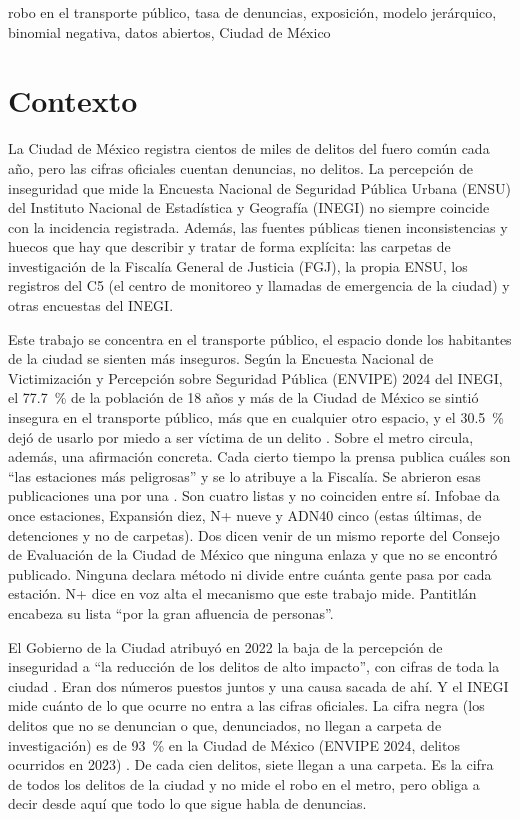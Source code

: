 \documentclass[conference]{IEEEtran}
\begin{document}
\begin{IEEEkeywords}
robo en el transporte público, tasa de denuncias, exposición, modelo jerárquico, binomial negativa, datos abiertos, Ciudad de México
\end{IEEEkeywords}

\section{Contexto}

La Ciudad de México registra cientos de miles de delitos del fuero común cada año, pero las cifras oficiales cuentan denuncias, no delitos. La percepción de inseguridad que mide la Encuesta Nacional de Seguridad Pública Urbana (ENSU) del Instituto Nacional de Estadística y Geografía (INEGI) no siempre coincide con la incidencia registrada. Además, las fuentes públicas tienen inconsistencias y huecos que hay que describir y tratar de forma explícita: las carpetas de investigación de la Fiscalía General de Justicia (FGJ), la propia ENSU, los registros del C5 (el centro de monitoreo y llamadas de emergencia de la ciudad) y otras encuestas del INEGI.

Este trabajo se concentra en el transporte público, el espacio donde los habitantes de la ciudad se sienten más inseguros. Según la Encuesta Nacional de Victimización y Percepción sobre Seguridad Pública (ENVIPE) 2024 del INEGI, el 77.7~\% de la población de 18 años y más de la Ciudad de México se sintió insegura en el transporte público, más que en cualquier otro espacio, y el 30.5~\% dejó de usarlo por miedo a ser víctima de un delito \cite{envipe2024cdmx}. Sobre el metro circula, además, una afirmación concreta. Cada cierto tiempo la prensa publica cuáles son ``las estaciones más peligrosas'' y se lo atribuye a la Fiscalía. Se abrieron esas publicaciones una por una \cite{infobae2024,expansion2024,nmas2023,adn40_2026}. Son cuatro listas y no coinciden entre sí. Infobae da once estaciones, Expansión diez, N+ nueve y ADN40 cinco (estas últimas, de detenciones y no de carpetas). Dos dicen venir de un mismo reporte del Consejo de Evaluación de la Ciudad de México que ninguna enlaza y que no se encontró publicado. Ninguna declara método ni divide entre cuánta gente pasa por cada estación. N+ dice en voz alta el mecanismo que este trabajo mide. Pantitlán encabeza su lista ``por la gran afluencia de personas''.

El Gobierno de la Ciudad atribuyó en 2022 la baja de la percepción de inseguridad a ``la reducción de los delitos de alto impacto'', con cifras de toda la ciudad \cite{cdmx_comunicado2022}. Eran dos números puestos juntos y una causa sacada de ahí. Y el INEGI mide cuánto de lo que ocurre no entra a las cifras oficiales. La cifra negra (los delitos que no se denuncian o que, denunciados, no llegan a carpeta de investigación) es de 93~\% en la Ciudad de México (ENVIPE 2024, delitos ocurridos en 2023) \cite{envipe2024cdmx}. De cada cien delitos, siete llegan a una carpeta. Es la cifra de todos los delitos de la ciudad y no mide el robo en el metro, pero obliga a decir desde aquí que todo lo que sigue habla de denuncias.
\end{document}
